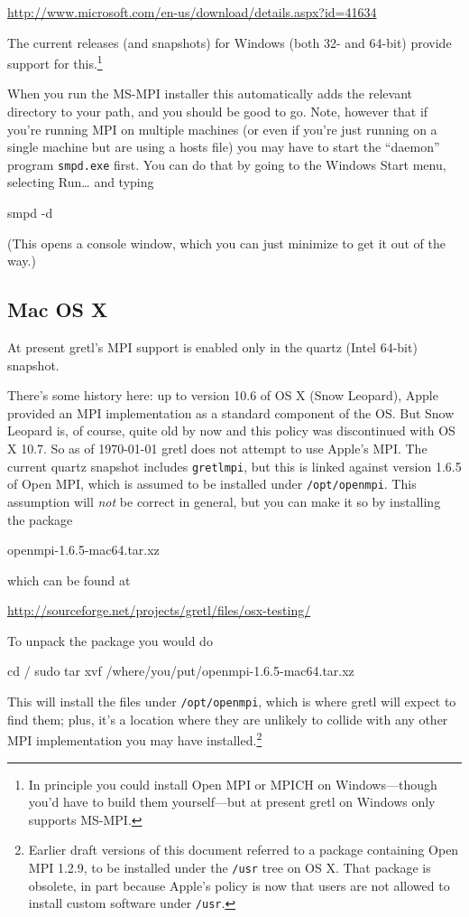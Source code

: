 \documentclass{article}
\begin{document}
\url{http://www.microsoft.com/en-us/download/details.aspx?id=41634}

The current releases (and snapshots) for Windows (both 32- and 64-bit)
provide support for this.\footnote{In principle you could install
  \textsf{Open MPI} or \textsf{MPICH} on Windows---though you'd have
  to build them yourself---but at present gretl on Windows only
  supports \textsf{MS-MPI}.}

When you run the \textsf{MS-MPI} installer this automatically adds the
relevant directory to your path, and you should be good to go. Note,
however that if you're running MPI on multiple machines (or even if
you're just running on a single machine but are using a hosts file)
you may have to start the ``daemon'' program \texttt{smpd.exe}
first. You can do that by going to the Windows Start menu, selecting
\textsf{Run\dots{}} and typing
\begin{code}
smpd -d
\end{code}
(This opens a console window, which you can just minimize to get it
out of the way.)

\subsection{Mac OS X}

At present gretl's MPI support is enabled only in the quartz (Intel
64-bit) snapshot.

There's some history here: up to version 10.6 of OS X (Snow Leopard),
Apple provided an MPI implementation as a standard component of the
OS. But Snow Leopard is, of course, quite old by now and this policy
was discontinued with OS X 10.7. So as of \today{} gretl does not
attempt to use Apple's MPI. The current quartz snapshot includes
\texttt{gretlmpi}, but this is linked against version 1.6.5 of
\textsf{Open MPI}, which is assumed to be installed under
\texttt{/opt/openmpi}. This assumption will \textit{not} be correct in
general, but you can make it so by installing the package
\begin{code}
openmpi-1.6.5-mac64.tar.xz
\end{code}
which can be found at

\url{http://sourceforge.net/projects/gretl/files/osx-testing/}

To unpack the package you would do
\begin{code}
cd /
sudo tar xvf /where/you/put/openmpi-1.6.5-mac64.tar.xz
\end{code}
%
This will install the files under \texttt{/opt/openmpi}, which is
where gretl will expect to find them; plus, it's a location where they
are unlikely to collide with any other MPI implementation you may have
installed.\footnote{Earlier draft versions of this document referred
  to a package containing \textsf{Open MPI} 1.2.9, to be installed
  under the \texttt{/usr} tree on OS X. That package is obsolete, in
  part because Apple's policy is now that users are not allowed to
  install custom software under \texttt{/usr}.}
\end{document}

